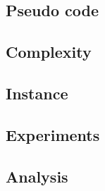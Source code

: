 \subsection{Pseudo code}


\subsection{Complexity}


\subsection{Instance}


\subsection{Experiments}


\subsection{Analysis}

\newpage